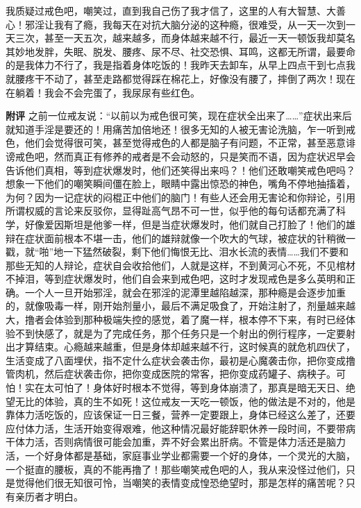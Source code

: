 \begin{case}
    我质疑过戒色吧，嘲笑过，直到我自己伤了我才信了，这里的人有大智慧、大善心！邪淫让我有了瘾，我每天在对抗大脑分泌的这种瘾，很难受，从一天一次到一天三次，甚至一天五次，越来越多，而身体越来越不行，最近一天一顿饭我却莫名其妙地发胖，失眠、脱发、腰疼、尿不尽、社交恐惧、耳鸣，这都无所谓，最要命的是我体力不行了，我是指着身体吃饭的！我昨天去卸车，从早上四点干到七点我就腰疼干不动了，甚至走路都觉得踩在棉花上，好像没有腰了，摔倒了两次！现在在躺着！我会不会完蛋了，我尿尿有些红色。

    \textbf{附评} 之前一位戒友说：“以前以为戒色很可笑，现在症状全出来了……”症状出来后就知道手淫是要还的！用痛苦加倍地还！很多无知的人被无害论洗脑，乍一听到戒色，他们会觉得很可笑，甚至觉得戒色的人都是脑子有问题，不正常，甚至恶意诽谤戒色吧，然而真正有修养的戒者是不会动怒的，只是笑而不语，因为症状迟早会告诉他们真相，等到症状爆发时，他们还笑得出来吗？！他们还敢嘲笑戒色吧吗？想象一下他们的嘲笑瞬间僵在脸上，眼睛中露出惊恐的神色，嘴角不停地抽搐着，为何？因为一记症状的闷棍正中他们的脑门！有些人还会用无害论和你辩论，引用所谓权威的言论来反驳你，显得趾高气昂不可一世，似乎他的每句话都充满了科学，好像爱因斯坦是他爹一样，但是当症状爆发时，他们就自己打脸了！他们的雄辩在症状面前根本不堪一击，他们的雄辩就像一个吹大的气球，被症状的针稍微一戳，就“啪”地一下猛然破裂，剩下他们悔恨无比、泪水长流的表情……我们不要和那些无知的人辩论，症状自会收拾他们，人就是这样，不到黄河心不死，不见棺材不掉泪，等到症状爆发时，他们自会来到戒色吧，这时才发现戒色是多么英明和正确。一个人一旦开始邪淫，就会在邪淫的泥潭里越陷越深，那种瘾是会逐步加重的，就像吸毒一样，刚开始剂量小，最后不满足吸食了，开始注射了，剂量越来越大，撸者会体验到那种极端失控的感觉，着了魔一样，根本停不下来，有时已经体验不到快感了，就是为了完成任务，那个任务只是一个射出的例行程序，一定要射出才算结束。心瘾越来越重，但是身体却越来越不行，这时候真的就危机四伏了，生活变成了八面埋伏，指不定什么症状会袭击你，最初是心魔袭击你，把你变成撸管肉机，然后症状袭击你，把你变成医院的常客，把你变成药罐子、病秧子。可怕！实在太可怕了！身体好时根本不觉得，等到身体崩溃了，那真是暗无天日、绝望无比的体验，真的生不如死！这位戒友一天吃一顿饭，他的做法是不对的，他是靠体力活吃饭的，应该保证一日三餐，营养一定要跟上，身体已经这么差了，还要应付体力活，生活开始变得艰难，他这种情况最好能辞职休养一段时间，不要带病干体力活，否则病情很可能会加重，弄不好会累出肝病。不管是体力活还是脑力活，一个好身体都是基础，家庭事业学业都需要一个好的身体，一个灵光的大脑，一个挺直的腰板，真的不能再撸了！那些嘲笑戒色吧的人，我从来没怪过他们，只是觉得他们很无知很可怜，当嘲笑的表情变成惶恐绝望时，那是怎样的痛苦呢？只有亲历者才明白。
\end{case}

